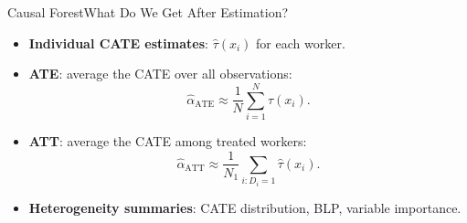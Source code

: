 \documentclass[hyperref={pdfpagelabels=false}]{beamer}
\begin{document}





\begin{frame}{Causal Forest}{What Do We Get After Estimation?}

\begin{itemize}
  \item \textbf{Individual CATE estimates}: $\hat{\tau}(x_i)$ for each worker.
  \vspace{0.15cm}
  \item \textbf{ATE}: average the CATE over all observations:
  \[
    \hat{\alpha}_{\text{ATE}}
    \approx
    \frac{1}{N}\sum_{i=1}^{N}\hat{\tau}(x_i).
  \]
  \vspace{0.15cm}
  \item \textbf{ATT}: average the CATE among treated workers:
  \[
    \hat{\alpha}_{\text{ATT}}
    \approx
    \frac{1}{N_1}\sum_{i:D_i=1}\hat{\tau}(x_i).
  \]
  \vspace{0.15cm}
  \item \textbf{Heterogeneity summaries}: CATE distribution, BLP, variable importance.
\end{itemize}

\end{frame}
\end{document}
